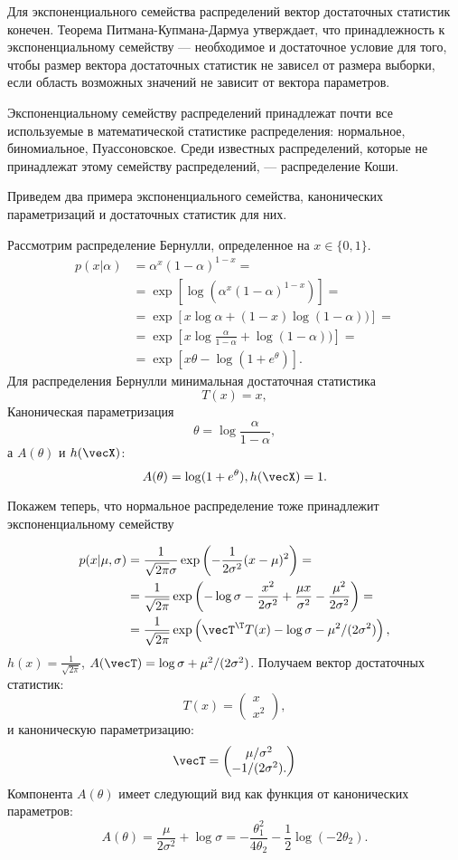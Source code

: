 Для экспоненциального семейства распределений вектор достаточных статистик конечен. Теорема Питмана-Купмана-Дармуа утверждает, что принадлежность к экспоненциальному семейству --- необходимое и достаточное условие для того, чтобы размер вектора достаточных статистик не зависел от размера выборки, если область возможных значений не зависит от вектора параметров.

Экспоненциальному семейству распределений принадлежат почти все используемые в математической статистике распределения: нормальное, биномиальное, Пуассоновское.
Среди известных распределений, которые не принадлежат этому семейству распределений, --- распределение Коши.

Приведем два примера экспоненциального семейства, канонических параметризаций и достаточных статистик для них.
\begin{example}
Рассмотрим распределение Бернулли, определенное на $x \in \{0, 1\}$.
\begin{align*}
p(x | \alpha) &= \alpha^{x} (1 - \alpha)^{1 - x} = \\
&= \exp \left[\log (\alpha^{x} (1 - \alpha)^{1 - x}) \right] = \\
&= \exp \left[x \log \alpha + (1 - x) \log (1 - \alpha)) \right] = \\
&= \exp \left[x \log \frac{\alpha}{1 - \alpha} + \log (1 - \alpha)) \right] = \\
&= \exp \left[x \theta - \log (1 + e^{\theta})\right].
\end{align*}
Для распределения Бернулли минимальная достаточная статистика
\[
T(x) = x, 
\]
Каноническая параметризация 
\[
\theta = \log \frac{\alpha}{1 - \alpha}, 
\]
а $A(\theta)$ и $h(\vecX)$:
\[
A(\theta) = \log (1 + e^{\theta}), h(\vecX) = 1.
\]
\end{example}

Покажем теперь, что нормальное распределение тоже принадлежит экспоненциальному семейству
\begin{example}
\begin{align*}
p(x| \mu, \sigma) &= \frac{1}{\sqrt{2 \pi} \sigma} \exp \left(-\frac{1}{2 \sigma^2} (x - \mu)^2 \right) =\\
     &= \frac{1}{\sqrt{2 \pi}} \exp \left(-\log \sigma - \frac{x^2}{2 \sigma^2} + \frac{\mu x}{\sigma^2} - \frac{\mu^2}{2 \sigma^2} \right) = \\
    &= \frac{1}{\sqrt{2 \pi}} \exp \left( \vecT^\T T(x) - \log \sigma - \mu^2 / (2 \sigma^2) \right),
\end{align*}
$h(x) = \frac{1}{\sqrt{2 \pi}}$, $A(\vecT) = \log \sigma + \mu^2 / (2 \sigma^2)$.
Получаем вектор достаточных статистик:
\[
T(x) = \begin{pmatrix}
x \\
x^2 
\end{pmatrix},
\]
и каноническую параметризацию:
\[
\vecT = \begin{pmatrix}
\mu / \sigma^2 \\
-1 / (2 \sigma^2).
\end{pmatrix}
\]
Компонента $A(\theta)$ имеет следующий вид как функция от канонических параметров:
\[
A(\theta) = \frac{\mu}{2 \sigma^2} + \log \sigma = - \frac{\theta_1^2}{4 \theta_2} - \frac12 \log (-2\theta_2).
\]
\end{example}

